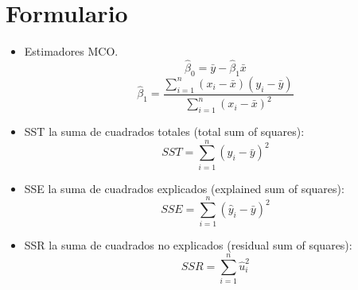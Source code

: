 \documentclass[10pt,a4paper]{article}
\begin{document}
    
\section{Formulario}
\begin{itemize}
\item  Estimadores MCO.
{\color{red}
$$\hat{\beta}_0 = \bar{y} - \hat{\beta}_1 \bar{x} $$
$$\hat{\beta}_1 = \frac{\sum_{i=1}^{n}(x_i - \bar{x})(y_i-\bar{y})}{\sum_{i=1}^{n}(x_i - \bar{x})^2}$$}

    
\item SST la suma de cuadrados totales (total sum of squares):
	{\color{red}	\[ SST = \sum_{i=1}^{n} (y_i - \bar{y})^2 \]}
		
		\item  SSE la suma de cuadrados explicados (explained sum of squares):
	{\color{red}	\[ SSE = \sum_{i=1}^{n} (\hat{y}_i - \bar{y})^2 \]}
		
		\item  SSR la suma de cuadrados no explicados (residual sum of squares):
	{\color{red}	\[ SSR = \sum_{i=1}^{n} \hat{u}_i^2 \]}

\end{itemize}
\end{document}
